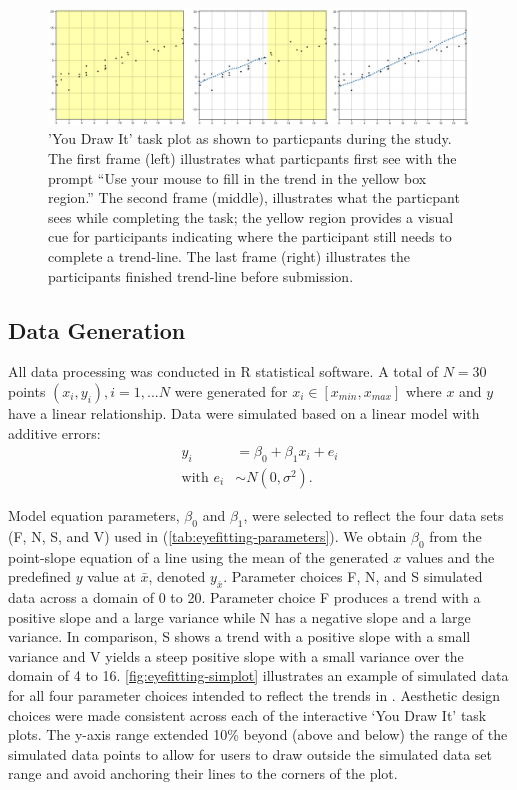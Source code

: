 \documentclass[12pt]{article}
\begin{document}
\begin{figure}[tbp]

{\centering \includegraphics[width=1\linewidth,]{images/ydi-stimuli} 

}

\caption{'You Draw It' task plot as shown to particpants during the study. The first frame (left) illustrates what particpants first see with the prompt “Use your mouse to fill in the trend in the yellow box region.” The second frame (middle), illustrates what the particpant sees while completing the task; the yellow region provides a visual cue for participants indicating where the participant still needs to complete a trend-line. The last frame (right) illustrates the participants finished trend-line before submission.}\label{fig:ydi-stimuli}
\end{figure}

\hypertarget{data-generation}{%
\subsection{Data Generation}\label{data-generation}}

All data processing was conducted in R statistical software. A total of
\(N = 30\) points \((x_i, y_i), i = 1,...N\) were generated for
\(x_i \in [x_{min}, x_{max}]\) where \(x\) and \(y\) have a linear
relationship. Data were simulated based on a linear model with additive
errors: \begin{align}
y_i & = \beta_0 + \beta_1 x_i + e_i \\
\text{with } e_i & \sim N(0, \sigma^2). \nonumber
\end{align}

Model equation parameters, \(\beta_0\) and \(\beta_1\), were selected to
reflect the four data sets (F, N, S, and V) used in
\citet{mosteller1981eye} (\cref{tab:eyefitting-parameters}). We obtain
\(\beta_0\) from the point-slope equation of a line using the mean of
the generated \(x\) values and the predefined \(y\) value at \(\bar x\),
denoted \(y_{\bar x}\). Parameter choices F, N, and S simulated data
across a domain of 0 to 20. Parameter choice F produces a trend with a
positive slope and a large variance while N has a negative slope and a
large variance. In comparison, S shows a trend with a positive slope
with a small variance and V yields a steep positive slope with a small
variance over the domain of 4 to 16. \cref{fig:eyefitting-simplot}
illustrates an example of simulated data for all four parameter choices
intended to reflect the trends in \citet{mosteller1981eye}. Aesthetic
design choices were made consistent across each of the interactive `You
Draw It' task plots. The y-axis range extended 10\% beyond (above and
below) the range of the simulated data points to allow for users to draw
outside the simulated data set range and avoid anchoring their lines to
the corners of the plot.
\end{document}
